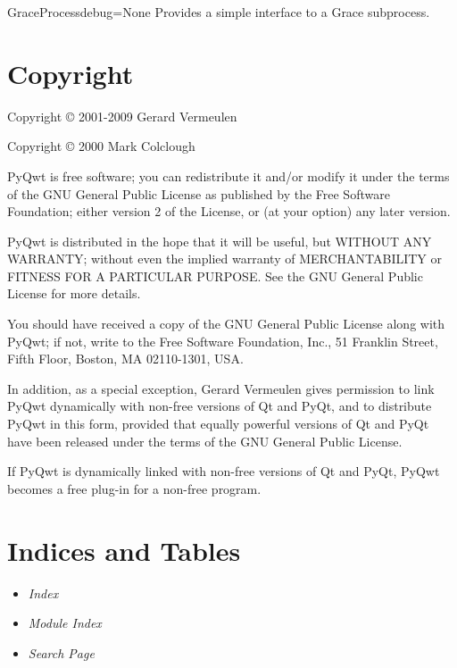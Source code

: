 \documentclass[a4paper,10pt,english]{manual}
\begin{document}
\hypertarget{PyQt4.Qwt5.grace.GraceProcess}{}\begin{classdesc}{GraceProcess}{debug=None}
Provides a simple interface to a Grace subprocess.
\end{classdesc}

\resetcurrentobjects
\hypertarget{--doc-copyright}{}

\chapter{Copyright}

Copyright © 2001-2009 Gerard Vermeulen

Copyright © 2000 Mark Colclough

PyQwt is free software; you can redistribute it and/or modify
it under the terms of the GNU General Public License as published by
the Free Software Foundation; either version 2 of the License, or
(at your option) any later version.

PyQwt is distributed in the hope that it will be useful,
but WITHOUT ANY WARRANTY; without even the implied warranty of
MERCHANTABILITY or FITNESS FOR A PARTICULAR PURPOSE.  See the
GNU General Public License for more details.

You should have received a copy of the GNU General Public License along
with PyQwt; if not, write to the Free Software Foundation, Inc.,
51 Franklin Street, Fifth Floor, Boston, MA  02110-1301, USA.

In addition, as a special exception, Gerard Vermeulen gives permission
to link PyQwt dynamically with non-free versions of Qt and PyQt,
and to distribute PyQwt in this form, provided that equally powerful
versions of Qt and PyQt have been released under the terms of the GNU
General Public License.

If PyQwt is dynamically linked with non-free versions of Qt and PyQt,
PyQwt becomes a free plug-in for a non-free program.


\chapter{Indices and Tables}
\begin{itemize}
\item {} 
\emph{Index}

\item {} 
\emph{Module Index}

\item {} 
\emph{Search Page}

\end{itemize}


\renewcommand{\indexname}{Module Index}
\printmodindex
\renewcommand{\indexname}{Index}
\printindex
\end{document}
